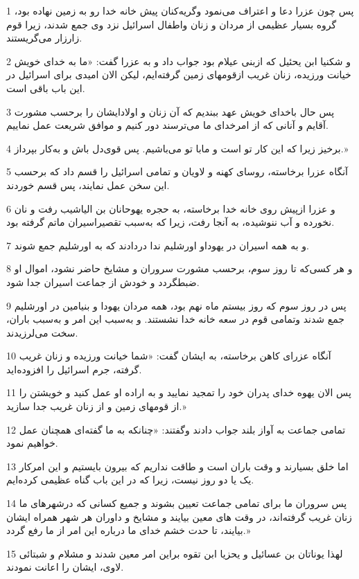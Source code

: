 \par 1 پس چون عزرا دعا و اعتراف می‌نمود وگریه‌کنان پیش خانه خدا رو به زمین نهاده بود، گروه بسیار عظیمی از مردان و زنان واطفال اسرائیل نزد وی جمع شدند، زیرا قوم زارزار می‌گریستند.
\par 2 و شکنیا ابن یحئیل که ازبنی عیلام بود جواب داد و به عزرا گفت: «ما به خدای خویش خیانت ورزیده، زنان غریب ازقومهای زمین گرفته‌ایم، لیکن الان امیدی برای اسرائیل در این باب باقی است.
\par 3 پس حال باخدای خویش عهد ببندیم که آن زنان و اولادایشان را برحسب مشورت آقایم و آنانی که از امرخدای ما می‌ترسند دور کنیم و موافق شریعت عمل نماییم.
\par 4 برخیز زیرا که این کار تو است و مابا تو می‌باشیم. پس قوی‌دل باش و به‌کار بپرداز.»
\par 5 آنگاه عزرا برخاسته، روسای کهنه و لاویان و تمامی اسرائیل را قسم داد که برحسب این سخن عمل نمایند، پس قسم خوردند.
\par 6 و عزرا ازپیش روی خانه خدا برخاسته، به حجره یهوحانان بن الیاشیب رفت و نان نخورده و آب ننوشیده، به آنجا رفت، زیرا که به‌سبب تقصیراسیران ماتم گرفته بود.
\par 7 و به همه اسیران در یهوداو اورشلیم ندا دردادند که به اورشلیم جمع شوند.
\par 8 و هر کسی‌که تا روز سوم، برحسب مشورت سروران و مشایخ حاضر نشود، اموال او ضبطگردد و خودش از جماعت اسیران جدا شود.
\par 9 پس در روز سوم که روز بیستم ماه نهم بود، همه مردان یهودا و بنیامین در اورشلیم جمع شدند وتمامی قوم در سعه خانه خدا نشستند. و به‌سبب این امر و به‌سبب باران، سخت می‌لرزیدند. 
\par 10 آنگاه عزرای کاهن برخاسته، به ایشان گفت: «شما خیانت ورزیده و زنان غریب گرفته، جرم اسرائیل را افزوده‌اید.
\par 11 پس الان یهوه خدای پدران خود را تمجید نمایید و به اراده او عمل کنید و خویشتن را از قومهای زمین و از زنان غریب جدا سازید.»
\par 12 تمامی جماعت به آواز بلند جواب دادند وگفتند: «چنانکه به ما گفته‌ای همچنان عمل خواهیم نمود.
\par 13 اما خلق بسیارند و وقت باران است و طاقت نداریم که بیرون بایستیم و این امرکار یک یا دو روز نیست، زیرا که در این باب گناه عظیمی کرده‌ایم.
\par 14 پس سروران ما برای تمامی جماعت تعیین بشوند و جمیع کسانی که درشهرهای ما زنان غریب گرفته‌اند، در وقت های معین بیایند و مشایخ و داوران هر شهر همراه ایشان بیایند، تا حدت خشم خدای ما درباره این امر از ما رفع گردد.»
\par 15 لهذا یوناتان بن عسائیل و یحزیا ابن تقوه براین امر معین شدند و مشلام و شبتائی لاوی، ایشان را اعانت نمودند.

